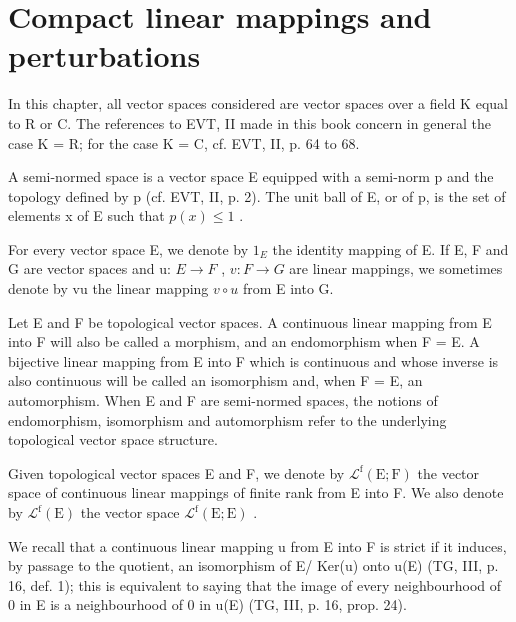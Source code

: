\chapter{Compact linear mappings and perturbations}
\setcounter{exercisepar}{0}

In this chapter, all vector spaces considered are vector spaces over a field K equal to R or C. The references to EVT, II made in this book concern in general the case K = R; for the case K = C, cf. EVT, II, p. 64 to 68.

A semi-normed space is a vector space E equipped with a semi-norm p and the topology defined by p (cf. EVT, II, p. 2). The unit ball of E, or of p, is the set of elements x of E such that \(p(x) \leqslant 1\) .

For every vector space E, we denote by \(1_{E}\) the identity mapping of E. If E, F and G are vector spaces and u: \(E \rightarrow F\) , \(v: F \rightarrow G\) are linear mappings, we sometimes denote by vu the linear mapping \(v \circ u\) from E into G.

Let E and F be topological vector spaces. A continuous linear mapping from E into F will also be called a morphism, and an endomorphism when F = E. A bijective linear mapping from E into F which is continuous and whose inverse is also continuous will be called an isomorphism and, when F = E, an automorphism. When E and F are semi-normed spaces, the notions of endomorphism, isomorphism and automorphism refer to the underlying topological vector space structure.

Given topological vector spaces E and F, we denote by \(\mathcal{L}^{\mathrm{f}}(\mathrm{E};\mathrm{F})\) the vector space of continuous linear mappings of finite rank from E into F. We also denote by \(\mathcal{L}^{\mathrm{f}}(\mathrm{E})\) the vector space \(\mathcal{L}^{\mathrm{f}}(\mathrm{E};\mathrm{E})\) .

We recall that a continuous linear mapping u from E into F is strict if it induces, by passage to the quotient, an isomorphism of E/ Ker(u) onto u(E) (TG, III, p. 16, def. 1); this is equivalent to saying that the image of every neighbourhood of 0 in E is a neighbourhood of 0 in u(E) (TG, III, p. 16, prop. 24).

